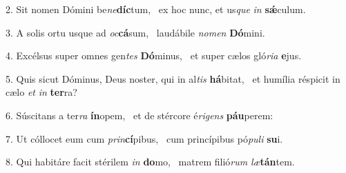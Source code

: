 2. Sit nomen Dómini be\textit{ne}\textbf{díc}tum, \ast\  ex hoc nunc, et us\textit{que} \textit{in} \textbf{sǽ}culum.\

3. A solis ortu usque ad \textit{oc}\textbf{cá}sum, \ast\  laudábile \textit{no}\textit{men} \textbf{Dó}mini.\

4. Excélsus super omnes gen\textit{tes} \textbf{Dó}minus, \ast\  et super cælos gló\textit{ri}\textit{a} \textbf{e}jus.\

5. Quis sicut Dóminus, Deus noster, qui in al\textit{tis} \textbf{há}bitat, \ast\  et humília réspicit in cælo \textit{et} \textit{in} \textbf{ter}ra?\

6. Súscitans a ter\textit{ra} \textbf{ín}opem, \ast\  et de stércore é\textit{ri}\textit{gens} \textbf{páu}perem:\

7. Ut cóllocet eum cum \textit{prin}\textbf{cí}pibus, \ast\  cum princípibus pó\textit{pu}\textit{li} \textbf{su}i.\

8. Qui habitáre facit stérilem \textit{in} \textbf{do}mo, \ast\  matrem filió\textit{rum} \textit{læ}\textbf{tán}tem.\

